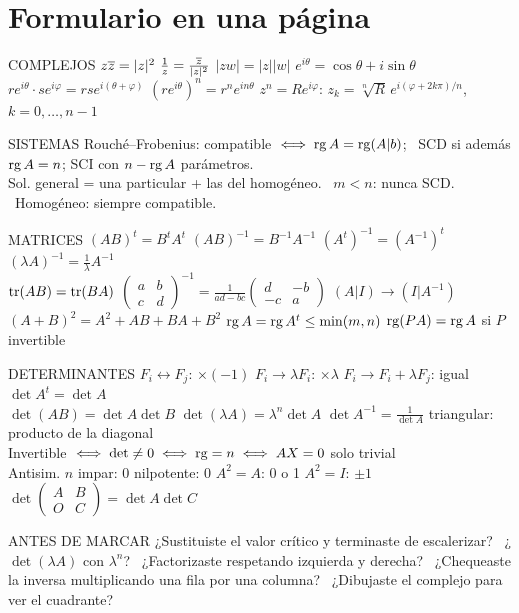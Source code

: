 \chapter{Formulario en una página}
{\small
\begin{memo}{COMPLEJOS}
$z\overline{z}=|z|^2$ \quad $\frac1z=\frac{\overline{z}}{|z|^2}$ \quad $|zw|=|z||w|$ \quad $e^{i\theta}=\cos\theta+i\sin\theta$\\
$re^{i\theta}\cdot se^{i\varphi}=rse^{i(\theta+\varphi)}$ \quad $(re^{i\theta})^n=r^ne^{in\theta}$ \quad $z^n=Re^{i\varphi}$: $z_k=\sqrt[n]R\,e^{i(\varphi+2k\pi)/n}$, $k=0,\dots,n-1$
\end{memo}
\begin{memo}{SISTEMAS}
Rouché--Frobenius: compatible $\iff\operatorname{rg} A=\operatorname{rg}(A|b)$; \ SCD si además $\operatorname{rg} A=n$; SCI con $n-\operatorname{rg} A$ parámetros.\\
Sol. general = una particular + las del homogéneo. \ $m<n$: nunca SCD. \ Homogéneo: siempre compatible.
\end{memo}
\begin{memo}{MATRICES}
$(AB)^t=B^tA^t$ \quad $(AB)^{-1}=B^{-1}A^{-1}$ \quad $(A^t)^{-1}=(A^{-1})^t$ \quad $(\lambda A)^{-1}=\frac1\lambda A^{-1}$\\
$\operatorname{tr}(AB)=\operatorname{tr}(BA)$ \quad $\begin{pmatrix}a&b\\c&d\end{pmatrix}^{-1}=\frac1{ad-bc}\begin{pmatrix}d&-b\\-c&a\end{pmatrix}$ \quad $(A|I)\to(I|A^{-1})$\\
$(A+B)^2=A^2+AB+BA+B^2$ \quad $\operatorname{rg} A=\operatorname{rg} A^t\le\min(m,n)$ \quad $\operatorname{rg}(PA)=\operatorname{rg} A$ si $P$ invertible
\end{memo}
\begin{memo}{DETERMINANTES}
$F_i\leftrightarrow F_j$: $\times(-1)$ \quad $F_i\to\lambda F_i$: $\times\lambda$ \quad $F_i\to F_i+\lambda F_j$: igual \quad $\det A^t=\det A$\\
$\det(AB)=\det A\det B$ \quad $\det(\lambda A)=\lambda^n\det A$ \quad $\det A^{-1}=\frac1{\det A}$ \quad triangular: producto de la diagonal\\
Invertible $\iff\det\neq0\iff\operatorname{rg}=n\iff AX=0$ solo trivial\\
Antisim. $n$ impar: 0 \quad nilpotente: 0 \quad $A^2=A$: 0 o 1 \quad $A^2=I$: $\pm1$ \quad $\det\begin{pmatrix}A&B\\O&C\end{pmatrix}=\det A\det C$
\end{memo}
\begin{trampa}{ANTES DE MARCAR}
¿Sustituiste el valor crítico y terminaste de escalerizar? \ ¿$\det(\lambda A)$ con $\lambda^n$? \ ¿Factorizaste respetando izquierda y derecha? \ ¿Chequeaste la inversa multiplicando una fila por una columna? \ ¿Dibujaste el complejo para ver el cuadrante?
\end{trampa}}
